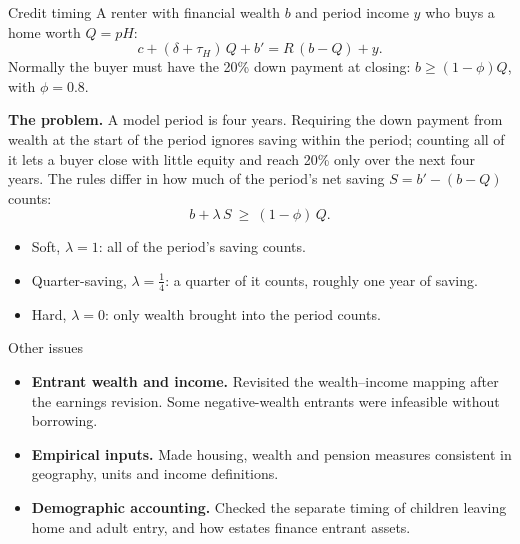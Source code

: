 \documentclass[11pt,aspectratio=169]{beamer}
\begin{document}
\begin{frame}{Credit timing}
\small
A renter with financial wealth $b$ and period income $y$ who buys a home worth $Q=pH$:
\[
c+(\delta+\tau_H)\,Q+b'=R\,(b-Q)+y .
\]
Normally the buyer must have the 20\% down payment at closing: $b\ge(1-\phi)Q$, with $\phi=0.8$.
\par\medskip
\textbf{The problem.} A model period is four years. Requiring the down payment from wealth at the start of the period ignores saving within the period; counting all of it lets a buyer close with little equity and reach 20\% only over the next four years. The rules differ in how much of the period's net saving $S=b'-(b-Q)$ counts:
\[
b+\lambda\,S\ \ge\ (1-\phi)\,Q .
\]
\begin{itemize}\setlength\itemsep{2pt}
 \item Soft, $\lambda=1$: all of the period's saving counts.
 \item Quarter-saving, $\lambda=\tfrac14$: a quarter of it counts, roughly one year of saving.
 \item Hard, $\lambda=0$: only wealth brought into the period counts.
\end{itemize}
\end{frame}

\begin{frame}{Other issues}
\small
\begin{itemize}\setlength\itemsep{12pt}
 \item \textbf{Entrant wealth and income.} Revisited the wealth--income mapping after the earnings revision. Some negative-wealth entrants were infeasible without borrowing.
 \item \textbf{Empirical inputs.} Made housing, wealth and pension measures consistent in geography, units and income definitions.
 \item \textbf{Demographic accounting.} Checked the separate timing of children leaving home and adult entry, and how estates finance entrant assets.
\end{itemize}
\end{frame}
\end{document}
